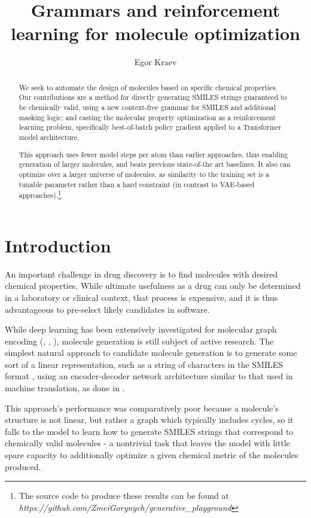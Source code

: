 \documentclass{article}
\title{Grammars and reinforcement learning for molecule optimization}
\author{Egor Kraev}
\begin{document}
\maketitle

\begin{abstract}
We seek to automate the design of molecules based on specific chemical properties. Our contributions are a method for directly generating SMILES strings guaranteed to be chemically valid, using a new context-free grammar for SMILES and additional masking logic; and casting the molecular property optimization as a reinforcement learning problem, specifically best-of-batch policy gradient applied to a Transformer model architecture.

This approach uses fewer model steps per atom than earlier approaches, thus enabling generation of larger molecules, and beats previous state-of-the art baselines. It also can optimize over a larger universe of molecules, as similarity to the training set is a tunable parameter rather than a hard constraint (in contrast to VAE-based approaches).\footnote{The source code to produce these results can be found at \emph{https://github.com/ZmeiGorynych/generative\_playground} }.

\end{abstract}
\section{Introduction}
An important challenge in drug discovery is to find molecules with desired chemical properties. While ultimate usefulness as a drug can only be determined in a laboratory or clinical context, that process is expensive, and it is thus advantageous to pre-select likely candidates in software. 

While deep learning has been extensively investigated for molecular graph encoding (\cite{Duvenaud15}, \cite{Kearnes16}, \cite{Gilmer17}), molecule generation is still subject of active research. The simplest natural approach to candidate molecule generation is to generate some sort of a linear representation, such as a string of characters in the SMILES format \cite{Weininger88}, using an encoder-decoder network architecture similar to that used in machine translation, as done in \cite{Gomez-Bombarelli16}.

This approach's performance was comparatively poor because a molecule's structure is not linear, but rather a graph which typically includes cycles, so it falls to the model to learn how to generate SMILES strings that correspond to chemically valid molecules - a nontrivial task that leaves the model with little spare capacity to additionally optimize a given chemical metric of the molecules produced.
\end{document}
